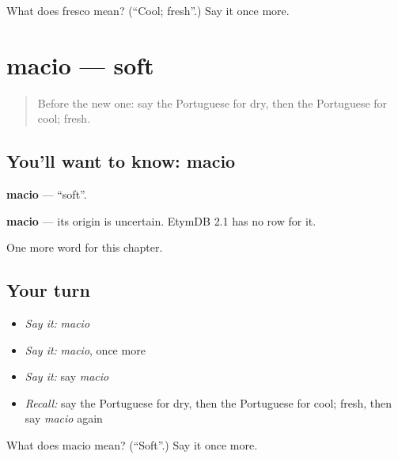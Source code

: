 \begin{tcolorbox}[breakable,colback=teal!4,colframe=teal!35!black,title={Before you move on}]
What does fresco mean? (\textquotedblleft{}Cool; fresh\textquotedblright{}.) Say it once more.
\end{tcolorbox}
\section[macio]{macio — soft}

\label{lesson:PT-C126-macio}



\begin{quote}
Before the new one: say the Portuguese for dry, then the Portuguese for cool; fresh.
\end{quote}

\subsection*{You'll want to know: macio}
\textbf{macio} — \textquotedblleft{}soft\textquotedblright{}.

\begin{cousinweb}
\textbf{macio} — its origin is uncertain. EtymDB 2.1 has no row for it.
\end{cousinweb}

\begin{grammarlens}[title={What you've built}]
One more word for this chapter.
\end{grammarlens}

\subsection*{Your turn}
\begin{itemize}
\raggedright
  \item \emph{Say it:} \emph{macio}
  \item \emph{Say it:} \emph{macio}, once more
  \item \emph{Say it:} say \emph{macio}
  \item \emph{Recall:} say the Portuguese for dry, then the Portuguese for cool; fresh, then say \emph{macio} again
\end{itemize}

\begin{tcolorbox}[breakable,colback=teal!4,colframe=teal!35!black,title={Before you move on}]
What does macio mean? (\textquotedblleft{}Soft\textquotedblright{}.) Say it once more.
\end{tcolorbox}
